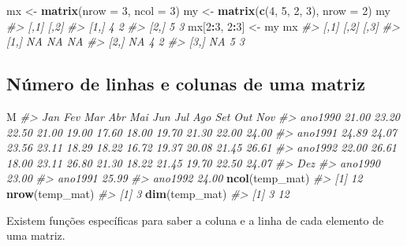 \documentclass[]{book}
\newenvironment{Shaded}{\begin{snugshade}}{\end{snugshade}}
\newcommand{\KeywordTok}[1]{\textcolor[rgb]{0.13,0.29,0.53}{\textbf{#1}}}
\newcommand{\DataTypeTok}[1]{\textcolor[rgb]{0.13,0.29,0.53}{#1}}
\newcommand{\DecValTok}[1]{\textcolor[rgb]{0.00,0.00,0.81}{#1}}
\newcommand{\StringTok}[1]{\textcolor[rgb]{0.31,0.60,0.02}{#1}}
\newcommand{\CommentTok}[1]{\textcolor[rgb]{0.56,0.35,0.01}{\textit{#1}}}
\newcommand{\OperatorTok}[1]{\textcolor[rgb]{0.81,0.36,0.00}{\textbf{#1}}}
\newcommand{\NormalTok}[1]{#1}
\begin{document}
\begin{Shaded}
\begin{Highlighting}[]
\NormalTok{mx <-}\StringTok{ }\KeywordTok{matrix}\NormalTok{(}\DataTypeTok{nrow =} \DecValTok{3}\NormalTok{, }\DataTypeTok{ncol =} \DecValTok{3}\NormalTok{)}
\NormalTok{my <-}\StringTok{ }\KeywordTok{matrix}\NormalTok{(}\KeywordTok{c}\NormalTok{(}\DecValTok{4}\NormalTok{, }\DecValTok{5}\NormalTok{, }\DecValTok{2}\NormalTok{, }\DecValTok{3}\NormalTok{), }\DataTypeTok{nrow =} \DecValTok{2}\NormalTok{)}
\NormalTok{my}
\CommentTok{#>      [,1] [,2]}
\CommentTok{#> [1,]    4    2}
\CommentTok{#> [2,]    5    3}
\NormalTok{mx[}\DecValTok{2}\OperatorTok{:}\DecValTok{3}\NormalTok{, }\DecValTok{2}\OperatorTok{:}\DecValTok{3}\NormalTok{] <-}\StringTok{ }\NormalTok{my}
\NormalTok{mx}
\CommentTok{#>      [,1] [,2] [,3]}
\CommentTok{#> [1,]   NA   NA   NA}
\CommentTok{#> [2,]   NA    4    2}
\CommentTok{#> [3,]   NA    5    3}
\end{Highlighting}
\end{Shaded}

\subsection{Número de linhas e colunas de uma
matriz}\label{numero-de-linhas-e-colunas-de-uma-matriz}

\begin{Shaded}
\begin{Highlighting}[]
\NormalTok{M}
\CommentTok{#>           Jan   Fev   Mar   Abr   Mai   Jun   Jul   Ago   Set   Out   Nov}
\CommentTok{#> ano1990 21.00 23.20 22.50 21.00 19.00 17.60 18.00 19.70 21.30 22.00 24.00}
\CommentTok{#> ano1991 24.89 24.07 23.56 23.11 18.29 18.22 16.72 19.37 20.08 21.45 26.61}
\CommentTok{#> ano1992 22.00 26.61 18.00 23.11 26.80 21.30 18.22 21.45 19.70 22.50 24.07}
\CommentTok{#>           Dez}
\CommentTok{#> ano1990 23.00}
\CommentTok{#> ano1991 25.99}
\CommentTok{#> ano1992 24.00}
\KeywordTok{ncol}\NormalTok{(temp_mat)}
\CommentTok{#> [1] 12}
\KeywordTok{nrow}\NormalTok{(temp_mat)}
\CommentTok{#> [1] 3}
\KeywordTok{dim}\NormalTok{(temp_mat)}
\CommentTok{#> [1]  3 12}
\end{Highlighting}
\end{Shaded}

Existem funções específicas para saber a coluna e a linha de cada
elemento de uma matriz.
\end{document}
